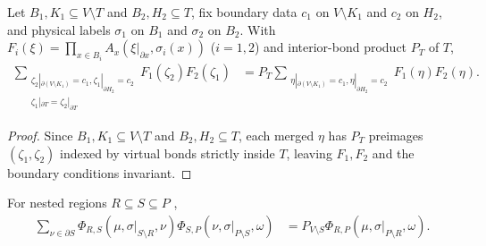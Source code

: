 
\begin{lemma}
    \label{lem:peps_two_block_merge_collapse}
    \leanok
    Let $B_1,K_1\subseteq V\setminus T$ and $B_2,H_2\subseteq T$, fix boundary
    data $c_1$ on $V\setminus K_1$ and $c_2$ on $H_2$, and physical labels
    $\sigma_1$ on $B_1$ and $\sigma_2$ on $B_2$. With
    $F_i(\xi)=\prod_{x\in B_i}A_x(\xi|_{\partial x},\sigma_i(x))$ ($i=1,2$) and
    interior-bond product $P_T$ of $T$,
    \begin{align}
        \sum_{\substack{
                \zeta_2|_{\partial(V\setminus K_1)}=c_1,
        \zeta_1|_{\partial H_2}=c_2 \\
                \zeta_1|_{\partial T}=\zeta_2|_{\partial T}}}
        F_1(\zeta_2)F_2(\zeta_1)
         & =
        P_T
        \sum_{\substack{
                \eta|_{\partial(V\setminus K_1)}=c_1,
                \eta|_{\partial H_2}=c_2}}
        F_1(\eta)F_2(\eta).
        \label{eq:peps_two_block_merge_collapse}
    \end{align}
\end{lemma}
\begin{proof}\leanok
    Since $B_1,K_1\subseteq V\setminus T$ and $B_2,H_2\subseteq T$, each merged
    $\eta$ has $P_T$ preimages $(\zeta_1,\zeta_2)$ indexed by virtual bonds
    strictly inside $T$, leaving $F_1,F_2$ and the boundary conditions invariant.
\end{proof}

\begin{lemma}
    \label{thm:peps_corner_extension_coefficient_composition}
    \leanok
    For nested regions $R\subseteq S\subseteq P$
    \cite[Section~4, proof of Theorem~3]{Molnar2018NormalPEPS},
    \begin{align}
        \sum_{\nu\in\partial S}
        \Phi_{R,S}(\mu,\sigma|_{S\setminus R},\nu)
        \Phi_{S,P}(\nu,\sigma|_{P\setminus S},\omega)
         & =
        P_{V\setminus S}
        \Phi_{R,P}(\mu,\sigma|_{P\setminus R},\omega).
        \label{eq:peps_corner_kernel_comp}
    \end{align}
\end{lemma}

